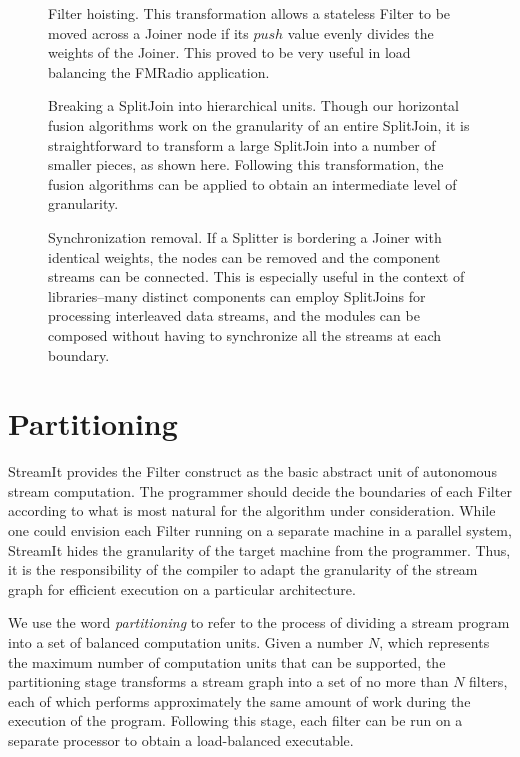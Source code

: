 \begin{figure}
\centering
{}
\caption{\protect\small Filter hoisting.  This transformation allows a
stateless Filter to be moved across a Joiner node if its $push$ value
evenly divides the weights of the Joiner.  This proved to be very
useful in load balancing the FMRadio application.
\protect\label{fig:filter-hoisting}}
\vspace{12pt}
\caption{\protect\small Breaking a SplitJoin into hierarchical units.
Though our horizontal fusion algorithms work on the granularity of an
entire SplitJoin, it is straightforward to transform a large SplitJoin
into a number of smaller pieces, as shown here.  Following this
transformation, the fusion algorithms can be applied to obtain an
intermediate level of granularity.
\protect\label{fig:splitjoin-split}}
\vspace{12pt}
\caption{\protect\small Synchronization removal.  If a Splitter is
bordering a Joiner with identical weights, the nodes can be removed
and the component streams can be connected.  This is especially useful
in the context of libraries--many distinct components can employ
SplitJoins for processing interleaved data streams, and the modules
can be composed without having to synchronize all the streams at each
boundary.  \protect\label{fig:sync-removal}}
\vspace{-6pt}
\end{figure}

\section{Partitioning}
\label{sec:partition}

StreamIt provides the Filter construct as the basic abstract unit of
autonomous stream computation.  The programmer should decide the
boundaries of each Filter according to what is most natural for the
algorithm under consideration.  While one could envision each Filter
running on a separate machine in a parallel system, StreamIt hides the
granularity of the target machine from the programmer.  Thus, it is
the responsibility of the compiler to adapt the granularity of the
stream graph for efficient execution on a particular architecture.

We use the word {\it partitioning} to refer to the process of dividing
a stream program into a set of balanced computation units.  Given a
number $N$, which represents the maximum number of computation units
that can be supported, the partitioning stage transforms a stream
graph into a set of no more than $N$ filters, each of which performs
approximately the same amount of work during the execution of the
program.  Following this stage, each filter can be run on a separate
processor to obtain a load-balanced executable.

